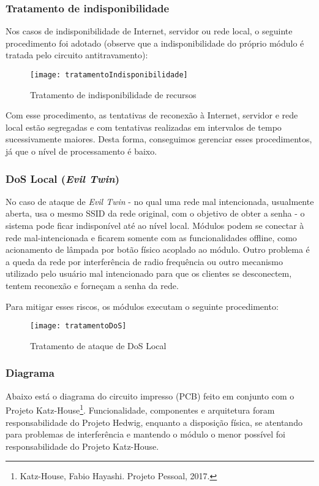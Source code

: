 \subsubsection{Tratamento de indisponibilidade}
Nos casos de indisponibilidade de Internet, servidor ou rede local, o seguinte procedimento foi adotado (observe que a indisponibilidade do próprio módulo é tratada pelo circuito antitravamento):

\begin{figure}[H]
	\centering
	\caption{Tratamento de indisponibilidade de recursos}
  \texttt{[image: tratamentoIndisponibilidade]}
\label{fig:tratamentoIndisponibilidade}
\end{figure}

Com esse procedimento, as tentativas de reconexão à Internet, servidor e rede local estão segregadas e com tentativas realizadas em intervalos de tempo sucessivamente maiores. Desta forma, conseguimos gerenciar esses procedimentos, já que o nível de processamento é baixo.

\subsubsection{DoS Local (\textit{Evil Twin})}
No caso de ataque de \textit{Evil Twin} - no qual uma rede mal intencionada, usualmente aberta, usa o mesmo SSID da rede original, com o objetivo de obter a senha - o sistema pode ficar indisponível até ao nível local. Módulos podem se conectar à rede mal-intencionada e ficarem somente com as funcionalidades offline, como acionamento de lâmpada por botão físico acoplado ao módulo. Outro problema é a queda da rede por interferência de radio frequência ou outro mecanismo utilizado pelo usuário mal intencionado para que os clientes se desconectem, tentem reconexão e forneçam a senha da rede.

Para mitigar esses riscos, os módulos executam o seguinte procedimento:
\begin{figure}[H]
	\centering
	\caption{Tratamento de ataque de DoS Local}
  \texttt{[image: tratamentoDoS]}
\label{fig:tratamentoDoS}
\end{figure}

\subsubsection{Diagrama}
Abaixo está o diagrama do circuito impresso (PCB) feito em conjunto com o Projeto Katz-House\footnote{Katz-House, Fabio Hayashi. Projeto Pessoal, 2017.}. Funcionalidade, componentes e arquitetura foram responsabilidade do Projeto Hedwig, enquanto a disposição física, se atentando para problemas de interferência e mantendo o módulo o menor possível foi responsabilidade do Projeto Katz-House.

